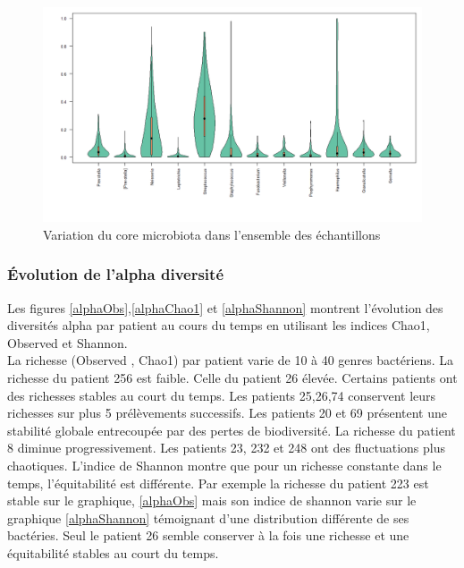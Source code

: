 \documentclass[12pt,a4paper]{article}
\begin{document}
\begin{figure}[t]
\begin{center}
\includegraphics[scale=0.5]{img/variability.png}\hfill
\end{center}
\caption{Variation du core microbiota dans l'ensemble des échantillons}
\label{violon}
\end{figure}

\subsubsection{Évolution de l'alpha diversité}
Les figures \ref{alphaObs},\ref{alphaChao1} et \ref{alphaShannon} montrent l’évolution des diversités alpha par patient au cours du temps en utilisant les indices Chao1, Observed et Shannon. \\
La richesse (Observed , Chao1) par patient varie de 10 à 40 genres bactériens. La richesse du patient 256 est faible. Celle du patient 26 élevée.
Certains patients ont des richesses stables au court du temps. Les patients 25,26,74 conservent leurs richesses sur plus 5 prélèvements successifs. Les patients 20 et 69 présentent une stabilité globale entrecoupée par des pertes de biodiversité. La richesse du patient 8 diminue progressivement. Les patients 23, 232 et 248 ont des fluctuations plus chaotiques.
L'indice de Shannon montre que pour un richesse constante dans le temps, l'équitabilité est différente. Par exemple la richesse du patient 223 est stable sur le graphique, \ref{alphaObs} mais son indice de shannon varie sur le graphique \ref{alphaShannon} témoignant d'une distribution différente de ses bactéries. Seul le patient 26 semble conserver à la fois une richesse et une équitabilité stables au court du temps.
\end{document}

